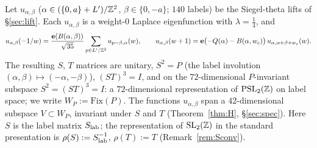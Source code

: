 \begin{theorem}\label{thm:F}
Let $u_{\alpha,\beta}$ ($\alpha\in(\{0,a\}+L')/\mathbb{Z}^2$, $\beta\in\{0,-a\}$; $140$ labels) be the
Siegel-theta lifts of \S\ref{sec:lift}. Each $u_{\alpha,\beta}$ is a weight-$0$ Laplace eigenfunction with
$\lambda=\tfrac14$, and
\[
u_{\alpha,\beta}(-1/w)=\frac{\mathbf{e}(B(\alpha,\beta))}{\sqrt{35}}\sum_{p\in L'/\mathbb{Z}^2}u_{p-\beta,\alpha}(w),\qquad
u_{\alpha,\beta}(w+1)=\mathbf{e}\bigl(-Q(\alpha)-B(\alpha,w_c)\bigr)\,u_{\alpha,\alpha+\beta+w_c}(w).
\]
The resulting $S$, $T$ matrices are unitary, $S^2=P$ (the label involution $(\alpha,\beta)\mapsto(-\alpha,-\beta)$),
$(ST)^3=I$, and on the $72$-dimensional $P$-invariant subspace $S^2=(ST)^3=I$: a $72$-dimensional representation of
$\mathrm{PSL}_2(\mathbb{Z})$ on label space; we write $W_P:=\mathrm{Fix}(P)$. The functions $u_{\alpha,\beta}$ span a $42$-dimensional subspace $V\subset W_P$, invariant under
$S$ and $T$ (Theorem~\ref{thm:H}, \S\ref{sec:spec}). Here $S$ is the label matrix $S_{\rm lab}$; the representation of $\mathrm{SL}_2(\mathbb{Z})$ in the standard
presentation is $\rho(S):=S_{\rm lab}^{-1}$, $\rho(T):=T$ (Remark~\ref{rem:Sconv}).
\end{theorem}

